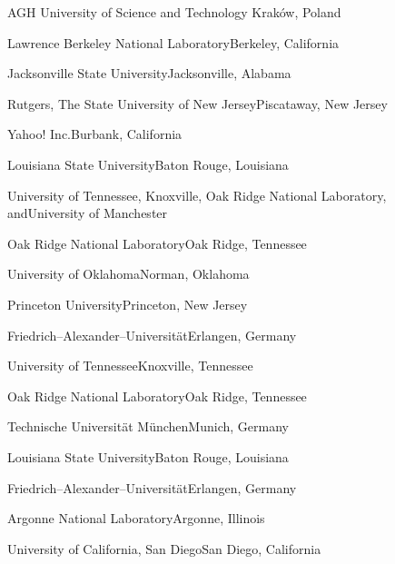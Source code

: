 \begin{multicols}{2}
 {AGH University of Science and Technology}{
Krak{\'o}w, Poland}


 {Lawrence Berkeley National
Laboratory}{Berkeley, California}

 {Jacksonville State University}{Jacksonville,
Alabama}

 {Rutgers, The State University of New
Jersey}{Piscataway, New Jersey}

 {Yahoo! Inc.}{Burbank, California}

{Louisiana State University}{Baton Rouge, Louisiana}

 {University of Tennessee, Knoxville,
Oak Ridge National Laboratory, and}{University of Manchester}\vspace*{-2pt}

 {Oak Ridge National Laboratory}{Oak Ridge,
Tennessee}\vspace*{-2pt}

 {University of Oklahoma}{Norman,
Oklahoma}\vspace*{-2pt}

 {Princeton University}{Princeton, New
Jersey}\vspace*{-2pt}

{Friedrich--Alexander--Universit{\"a}t}{Erlangen, Germany}

 {University of Tennessee}{Knoxville,
Tennessee}

 {Oak Ridge National Laboratory}{Oak Ridge,
Tennessee}

 {Technische Universit{\"a}t
M{\"u}nchen}{Munich, Germany}

{Louisiana State University}{Baton Rouge, Louisiana}

{Friedrich--Alexander--Universit{\"a}t}{Erlangen, Germany}

 {Argonne National Laboratory}{Argonne,
Illinois}

 {University of California, San
Diego}{San Diego, California}


\end{multicols}
